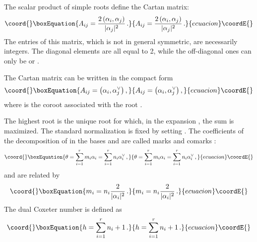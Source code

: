 \documentclass[a4paper,12pt]{report}
\begin{document}
The scalar product of simple roots define the Cartan matrix:
\begin{equation}\coord{}\boxEquation{
A_{ij}=\frac{2\left(\alpha_{i},\alpha_{j}\right)}{|\alpha_{j}|^{2}}\,.
}{
A_{ij}=\frac{2\left(\alpha_{i},\alpha_{j}\right)}{|\alpha_{j}|^{2}}\,.
}{ecuacion}\coordE{}\end{equation}
The entries of this matrix, which is not in general symmetric, are necessarily integers. The diagonal elements are
all equal to 2, while the off-diagonal ones can only be \coordHE{} or \coordHE{}.

The Cartan matrix can be written in the compact form
\begin{equation}\coord{}\boxEquation{
A_{ij}=\left(\alpha_{i},\alpha_{j}^{\vee}\right),
}{
A_{ij}=\left(\alpha_{i},\alpha_{j}^{\vee}\right),
}{ecuacion}\coordE{}\end{equation}
where \coordHE{} is the coroot associated with the root \coordHE{}.


The highest root \myHighlight{$\theta$}\coordHE{} is the unique root for which, in the expansion \coordHE{}, the sum \coordHE{} is maximized. The standard normalization is fixed by setting \coordHE{}. The coefficients of the
decomposition of \myHighlight{$\theta$}\coordHE{} in the bases \coordHE{} and \coordHE{} are
called marks \coordHE{} and comarks \coordHE{}:
\begin{equation}\coord{}\boxEquation{
\theta=\sum_{i=1}^{r}m_{i}\alpha_{i}=\sum_{i=1}^{r}n_{i}\alpha_{i}^{\vee}\,,
}{
\theta=\sum_{i=1}^{r}m_{i}\alpha_{i}=\sum_{i=1}^{r}n_{i}\alpha_{i}^{\vee}\,,
}{ecuacion}\coordE{}\end{equation}
and are related by
\begin{equation}\coord{}\boxEquation{
m_{i}=n_{i}\frac{2}{|\alpha_{i}|^{2}}\,.
}{
m_{i}=n_{i}\frac{2}{|\alpha_{i}|^{2}}\,.
}{ecuacion}\coordE{}\end{equation}
The dual Coxeter number is defined as
\begin{equation}\coord{}\boxEquation{
h=\sum_{i=1}^{r}n_{i}+1\,.
}{
h=\sum_{i=1}^{r}n_{i}+1\,.
}{ecuacion}\coordE{}\end{equation}
\end{document}
